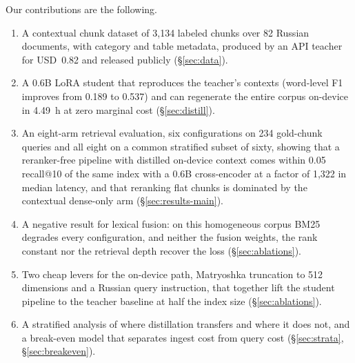 Our contributions are the following.

\begin{enumerate}
  \item A contextual chunk dataset of 3{,}134 labeled chunks over 82 Russian
  documents, with category and table metadata, produced by an API
  teacher for USD~0.82 and released publicly (\S\ref{sec:data}).
  \item A 0.6B LoRA student that reproduces the teacher's contexts (word-level
  F1 improves from 0.189 to 0.537) and can regenerate the entire corpus
  on-device in 4.49~h at zero marginal cost (\S\ref{sec:distill}).
  \item An eight-arm retrieval evaluation, six configurations on 234 gold-chunk
  queries and all eight on a common stratified subset of sixty, showing that a
  reranker-free pipeline with distilled on-device context comes within 0.05
  recall@10 of the same index with a 0.6B cross-encoder at a factor of 1{,}322
  in median latency, and that reranking flat chunks is dominated by the
  contextual dense-only arm (\S\ref{sec:results-main}).
  \item A negative result for lexical fusion: on this homogeneous corpus BM25
  degrades every configuration, and neither the fusion weights, the rank
  constant nor the retrieval depth recover the loss (\S\ref{sec:ablations}).
  \item Two cheap levers for the on-device path, Matryoshka truncation to 512
  dimensions and a Russian query instruction, that together lift the student
  pipeline to the teacher baseline at half the index size
  (\S\ref{sec:ablations}).
  \item A stratified analysis of where distillation transfers and where it does
  not, and a break-even model that separates ingest cost from query cost
  (\S\ref{sec:strata}, \S\ref{sec:breakeven}).
\end{enumerate}

